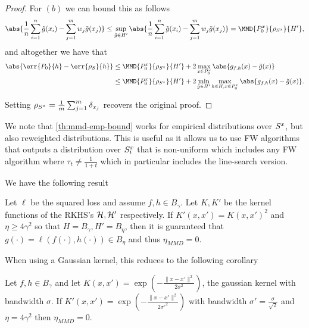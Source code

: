 \begin{proof}
  For \((b)\) we can bound this as follows
  \begin{equation*}
    \abs{\frac{1}{n} \sum_{i=1}^n\tilde{g}(x_i) - \sum_{j=1}^m w_j \tilde{g}(x_j)} \leq \sup_{\tilde{g} \in H'}\abs{\frac{1}{n} \sum_{i=1}^n \tilde{g}(x_i) - \sum_{j=1}^m w_j \tilde{g}(x_j)} = \MMD{\poolsetx_0}{\rho_{\trainsetx}}{H'},
  \end{equation*}
  and altogether we have that
  \begin{align*}
    \abs{\err{\poolset_0}{h} - \err{\rho_{\trainset}}{h}} & \leq \MMD{\poolsetx_0}{\rho_{\trainsetx}}{H'} + 2\max_{x \in \poolsetx_0}\abs{g_{f, h}(x) - \tilde{g}(x)} \\
                                                          & \leq \MMD{\poolsetx_0}{\rho_{\trainsetx}}{H'} + 2\min_{\tilde{g} \in H'}\max_{h \in H, x \in \poolsetx_0}\abs{g_{f, h}(x) - \tilde{g}(x)}.
  \end{align*}

  Setting \(\rho_{S^x} = \frac{1}{m}\sum_{j=1}^{m}\delta_{x_{j}}\) recovers the original proof.
\end{proof}

We note that \ref{th:mmd-emp-bound} works for empirical distributions over
\(S^x\), but also reweighted distributions. This is useful as it allows
us to use FW algorithms that outputs a distribution over \(S^x_{t}\) that
is non-uniform which includes any FW algorithm where \(\tau_t \neq
\frac{1}{1+t}\) which in particular includes the line-search version.

We have the following result
\begin{theorem}
  \label{thm:zero_eta_MMD}
  Let \(\ell\) be the squared loss and assume \(f, h \in B_{\gamma}\). Let \(K, K'\)
  be the kernel functions of the RKHS's \(\mathcal{H}, \mathcal{H}'\) respectively. If
  \(K'(x, x') = K(x, x')^2\) and \(\eta \geq 4\gamma^2\) so that \(H =
  B_{\gamma}, H' = B_{\eta}\), then it is guaranteed
  that \(g(\cdot) = \ell(f(\cdot), h(\cdot)) \in B_{\eta}\) and thus \(\eta_{MMD}
  = 0\).
\end{theorem}
When using a Gaussian kernel, this reduces to the following corollary
\begin{corollary}
  \label{cor:gauss-kernel-squared-gives-eta-zero}
  Let \(f, h \in B_{\gamma}\) and let \(K(x, x') = \exp(- \frac{\|x - x'\|^2}{2\sigma^2})\), the gaussian kernel with
  bandwidth \(\sigma\). If \(K'(x, x') = \exp(- \frac{\|x - x'\|^2}{2\sigma'^2})\) with bandwidth \(\sigma' =
  \frac{\sigma}{\sqrt{2}}\) and \(\eta = 4\gamma^2\) then \(\eta_{MMD} = 0\).
\end{corollary}

